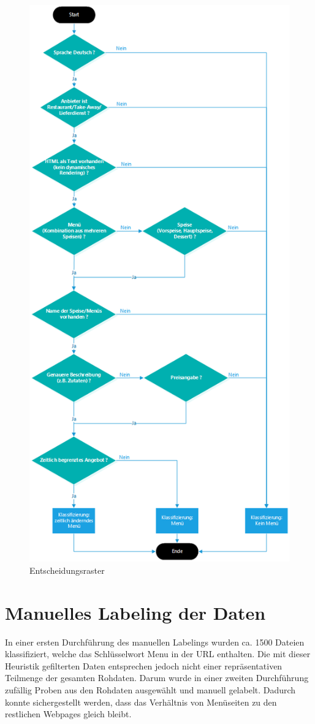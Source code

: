 \begin{figure}	
	\includegraphics[width=0.65\columnwidth,keepaspectratio]{img/man-classification-tree.png}
	\caption{Entscheidungsraster}
	\label{fig:classificationtree}
\end{figure}
\section{Manuelles Labeling der Daten}
In einer ersten Durchführung des manuellen Labelings wurden ca. 1500 Dateien klassifiziert, welche das Schlüsselwort \glqq Menu\grqq{} in der URL enthalten.
Die mit dieser Heuristik gefilterten Daten entsprechen jedoch nicht einer repräsentativen Teilmenge der gesamten Rohdaten.
Darum wurde in einer zweiten Durchführung zufällig Proben aus den Rohdaten ausgewählt und manuell gelabelt.
Dadurch konnte sichergestellt werden, dass das Verhältnis von Menüseiten zu den restlichen Webpages gleich bleibt.
